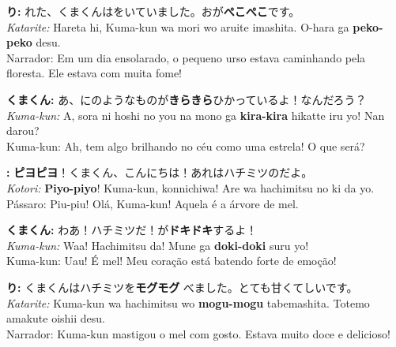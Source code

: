 \documentclass[a4paper,12pt]{article}
\begin{document}
\vspace{0.8em}

\textbf{り:} れた、くまくんはをいていました。おが\textbf{ぺこぺこ}です。\\
\textit{Katarite:} Hareta hi, Kuma-kun wa mori wo aruite imashita. O-hara ga \textbf{peko-peko} desu.\\
Narrador: Em um dia ensolarado, o pequeno urso estava caminhando pela floresta. Ele estava com muita fome!

\vspace{0.5em}

\textbf{くまくん:} あ、にのようなものが\textbf{きらきら}ひかっているよ！なんだろう？\\
\textit{Kuma-kun:} A, sora ni hoshi no you na mono ga \textbf{kira-kira} hikatte iru yo! Nan darou?\\
Kuma-kun: Ah, tem algo brilhando no céu como uma estrela! O que será?

\vspace{0.5em}

\textbf{:} \textbf{ピヨピヨ}！くまくん、こんにちは！あれはハチミツのだよ。\\
\textit{Kotori:} \textbf{Piyo-piyo}! Kuma-kun, konnichiwa! Are wa hachimitsu no ki da yo.\\
Pássaro: Piu-piu! Olá, Kuma-kun! Aquela é a árvore de mel.

\vspace{0.5em}

\textbf{くまくん:} わあ！ハチミツだ！が\textbf{ドキドキ}するよ！\\
\textit{Kuma-kun:} Waa! Hachimitsu da! Mune ga \textbf{doki-doki} suru yo!\\
Kuma-kun: Uau! É mel! Meu coração está batendo forte de emoção!

\vspace{0.5em}

\textbf{り:} くまくんはハチミツを\textbf{モグモグ} べました。とても甘くてしいです。\\
\textit{Katarite:} Kuma-kun wa hachimitsu wo \textbf{mogu-mogu} tabemashita. Totemo amakute oishii desu.\\
Narrador: Kuma-kun mastigou o mel com gosto. Estava muito doce e delicioso!

\vspace{0.5em}
\end{document}
